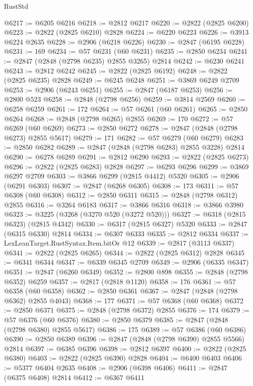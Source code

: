 \begin{lexlean}{RustStd}
\begin{coremodule}
@6217 := @6205 @6216
@6218 := @2812 @6217
@6220 := @2822 (@2825 @6200)
@6223 := @2822 (@2825 @6210) @2828
@6224 := @6220 @6223
@6226 := @3913 @6224 @2635
@6228 := @2906 (@6218 @6226)
@6230 := @2847 (@6195 @6228)
@6231 := 169
@6234 := @57 @6231 (@60 @6231)
@6235 := @2850 @6234
@6241 := @2847 (@2848 (@2798 @6235) @2855 @3265) @2814
@6242 := @6230 @6241
@6243 := @2812 @6242
@6245 := @2822 (@2825 @6192)
@6248 := @2822 (@2825 @6235) @2828
@6249 := @6245 @6248
@6251 := @3869 @6249 @2709
@6253 := @2906 (@6243 @6251)
@6255 := @2847 (@6187 @6253)
@6256 := @2800 @523
@6258 := @2848 (@2798 @6256)
@6259 := @3814 @2569
@6260 := @6258 @6259
@6261 := 172
@6264 := @57 @6261 (@60 @6261)
@6265 := @2850 @6264
@6268 := @2848 (@2798 @6265) @2855
@6269 := 170
@6272 := @57 @6269 (@60 @6269)
@6273 := @2850 @6272
@6278 := @2847 (@2848 (@2798 @6273) @2855 @5617)
@6279 := 171
@6282 := @57 @6279 (@60 @6279)
@6283 := @2850 @6282
@6289 := @2847 (@2848 (@2798 @6283) @2855 @3228) @2814
@6290 := @6278 @6289
@6291 := @2812 @6290
@6293 := @2822 (@2825 @6273)
@6296 := @2822 (@2825 @6283) @2828
@6297 := @6293 @6296
@6299 := @3869 @6297 @2709
@6303 := @3866 @6299 (@2815 @4412) @5320
@6305 := @2906 (@6291 @6303)
@6307 := @2847 (@6268 @6305)
@6308 := 173
@6311 := @57 @6308 (@60 @6308)
@6312 := @2850 @6311
@6315 := @2848 (@2798 @6312) @2855
@6316 := @3264 @6183
@6317 := @3866 @6316
@6318 := @3866 @3980
@6323 := @3225 (@3268 (@3270 @520 (@3272 @520)))
@6327 := @6318 (@2815 @6323) (@2815 @4342)
@6330 := @6317 (@2815 @6327) @5320
@6333 := @2847 (@6315 @6330) @2814
@6334 := @6307 @6333
@6335 := @2812 @6334
@6337 := LexLeanTarget.RustSyntax.Item.bitOr @12
@6339 := @2817 (@3113 @6337)
@6341 := @2822 (@2825 @6265)
@6344 := @2822 (@2825 @6312) @2828
@6345 := @6341 @6344
@6347 := @6339 @6345 @2709
@6349 := @2906 (@6335 @6347)
@6351 := @2847 (@6260 @6349)
@6352 := @2800 @898
@6355 := @2848 (@2798 @6352) @6259
@6357 := @2817 (@2818 @1120)
@6358 := 176
@6361 := @57 @6358 (@60 @6358)
@6362 := @2850 @6361
@6367 := @2847 (@2848 (@2798 @6362) @2855 @4043)
@6368 := 177
@6371 := @57 @6368 (@60 @6368)
@6372 := @2850 @6371
@6375 := @2848 (@2798 @6372) @2855
@6376 := 174
@6379 := @57 @6376 (@60 @6376)
@6380 := @2850 @6379
@6385 := @2847 (@2848 (@2798 @6380) @2855 @5617)
@6386 := 175
@6389 := @57 @6386 (@60 @6386)
@6390 := @2850 @6389
@6396 := @2847 (@2848 (@2798 @6390) @2855 @5566) @2814
@6397 := @6385 @6396
@6398 := @2812 @6397
@6400 := @2822 (@2825 @6380)
@6403 := @2822 (@2825 @6390) @2828
@6404 := @6400 @6403
@6406 := @5377 @6404 @2635
@6408 := @2906 (@6398 @6406)
@6411 := @2847 (@6375 @6408) @2814
@6412 := @6367 @6411

\end{coremodule}
\end{lexlean}
